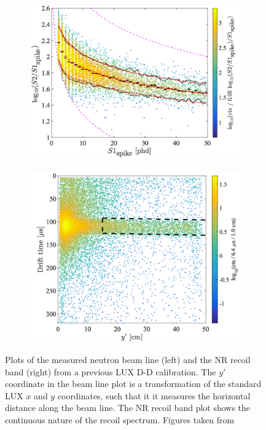 \begin{figure}[h!]
\centering
\begin{subfigure}{0.5\textwidth}
  \centering
  \includegraphics[width=\textwidth]{Figures/DDband.pdf}
\end{subfigure}%
\begin{subfigure}{0.5\textwidth}
  \centering
  \includegraphics[width=\textwidth]{Figures/DDbeam.pdf}
\end{subfigure}
\caption{Plots of the measured neutron beam line (left) and the NR recoil band (right) from a previous LUX D-D calibration. The $y'$ coordinate in the beam line plot is a transformation of the standard LUX $x$ and $y$ coordinates, such that it it measures the horizontal distance along the beam line. The NR recoil band plot shows the continuous nature of the recoil spectrum. Figures taken from \cite{lux_dd2} }
\label{fig:ddplot}
\end{figure}

